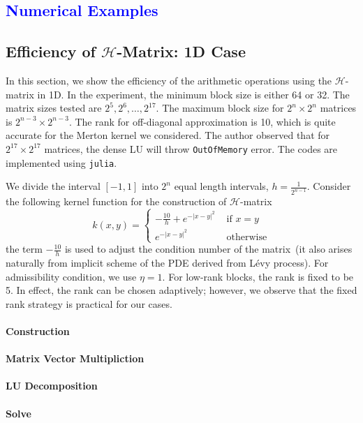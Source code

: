 \documentclass[10pt,a4paper]{article}
\newcommand{\lib}[1]{\textcolor{blue}{\section{#1}}}
\theoremstyle{definition}
\begin{document}
\lib{Numerical Examples}


\subsection{Efficiency of $\mathcal{H}$-Matrix: 1D Case}

In this section, we show the efficiency of the arithmetic operations using the $\mathcal{H}$-matrix in 1D. In the experiment, the minimum block size is either 64 or 32. The matrix sizes tested are $2^5, 2^6, \ldots, 2^{17}$. The maximum block size for $2^n\times 2^n$ matrices is $2^{n-3}\times 2^{n-3}$. The rank for off-diagonal approximation is 10, which is quite accurate for the Merton kernel we considered. The author observed that for $2^{17}\times 2^{17}$ matrices, the dense LU will throw \texttt{OutOfMemory} error. The codes are implemented using \texttt{julia}. 


We divide the interval $[-1,1]$ into $2^n$ equal length intervals, $h=\frac{1}{2^{n-1}}$. Consider the following kernel function for the construction of $\mathcal{H}$-matrix
\begin{equation}
	k(x,y) = \begin{cases}
		-\frac{10}{h} + e^{-|x-y|^2} & \mbox{ if } x=y\\
		e^{-|x-y|^2} & \mbox{ otherwise}
	\end{cases}
\end{equation}
the term $-\frac{10}{h}$ is used to adjust the condition number of the matrix~(it also arises naturally from implicit scheme of the PDE derived from L\'evy process). For admissibility condition,  we use $\eta=1$. For low-rank blocks, the rank is fixed to be 5. In effect, the rank can be chosen adaptively; however, we observe that the fixed rank strategy is practical for our cases. 

\paragraph{Construction}

\paragraph{Matrix Vector Multipliction}

\paragraph{LU Decomposition}

\paragraph{Solve}
\end{document}
